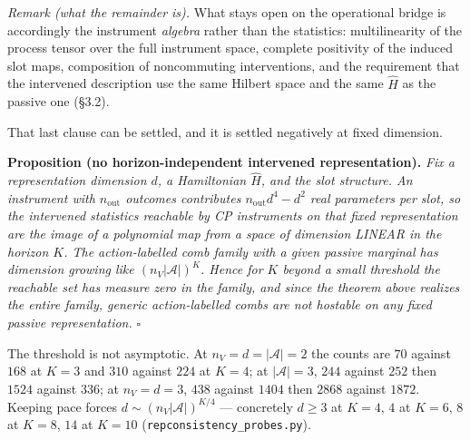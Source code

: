 \documentclass[
]{article}
\begin{document}
\emph{Remark (what the remainder is).} What stays open on the
operational bridge is accordingly the instrument \emph{algebra} rather
than the statistics: multilinearity of the process tensor over the full
instrument space, complete positivity of the induced slot maps,
composition of noncommuting interventions, and the requirement that the
intervened description use the same Hilbert space and the same
\(\hat{H}\) as the passive one (§3.2).

That last clause can be settled, and it is settled negatively at fixed
dimension.

\textbf{Proposition (no horizon-independent intervened representation).}
\emph{Fix a representation dimension \(d\), a Hamiltonian \(\hat{H}\),
and the slot structure. An instrument with \(n_{\text{out}}\) outcomes
contributes \(n_{\text{out}} d^4 - d^2\) real parameters per slot, so
the intervened statistics reachable by CP instruments on that fixed
representation are the image of a polynomial map from a space of
dimension LINEAR in the horizon \(K\). The action-labelled comb family
with a given passive marginal has dimension growing like
\((n_V |\mathcal{A}|)^K\). Hence for \(K\) beyond a small threshold the
reachable set has measure zero in the family, and since the theorem
above realizes the entire family, generic action-labelled combs are not
hostable on any fixed passive representation.} \(\square\)

The threshold is not asymptotic. At \(n_V = d = |\mathcal{A}| = 2\) the
counts are \(70\) against \(168\) at \(K = 3\) and \(310\) against
\(224\) at \(K = 4\); at \(|\mathcal{A}| = 3\), \(244\) against \(252\)
then \(1524\) against \(336\); at \(n_V = d = 3\), \(438\) against
\(1404\) then \(2868\) against \(1872\). Keeping pace forces
\(d \sim (n_V |\mathcal{A}|)^{K/4}\) --- concretely \(d \geq 3\) at
\(K = 4\), \(4\) at \(K = 6\), \(8\) at \(K = 8\), \(14\) at \(K = 10\)
(\texttt{repconsistency\_probes.py}).
\end{document}

